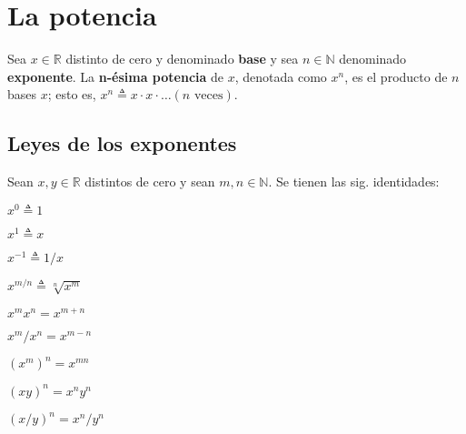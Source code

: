 \chapter{La potencia}

Sea \(x\in\mathbb{R}\) distinto de cero y denominado \textbf{base} y sea \(n\in\mathbb{N}\) denominado \textbf{exponente}. 
La \textbf{n-ésima potencia} de \(x\), denotada como \(x^n\), es el producto de \(n\) bases \(x\); esto es, \(x^n\triangleq x\cdot x\cdot\dots(n\text{ veces})\).

\section{Leyes de los exponentes}

Sean \(x,y\in\mathbb{R}\) distintos de cero y sean \(m,n\in\mathbb{N}\).
Se tienen las sig. identidades:
\begin{enumerate}
  \begin{multicols}{3}
    \item \(x^{0}\triangleq1\)
    \item \(x^{1}\triangleq x\)
    \item \(x^{-1}\triangleq1/x\)
    \item \(x^{m/n}\triangleq\sqrt[n]{x^{m}}\)
    \item \(x^{m}x^{n}=x^{m+n}\)
    \item \(x^{m}/x^{n}=x^{m-n}\)
    \item \((x^{m})^{n}=x^{mn}\)
    \item \((xy)^{n}=x^{n}y^{n}\)
    \item \((x/y)^{n}=x^{n}/y^{n}\)
  \end{multicols}
\end{enumerate}

